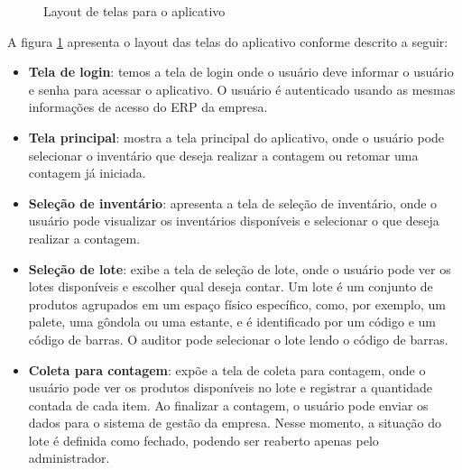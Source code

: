 \begin{figure}[t]
{    }
    \quad
    \caption{Layout de telas para o aplicativo}
    \label{fig:telas}
\end{figure}

A figura \ref{fig:telas} apresenta o layout das telas do aplicativo conforme descrito a seguir:

\begin{itemize}
    \item \textbf{Tela de login}: temos a tela de login onde o usuário deve informar o usuário e senha para acessar o aplicativo. O usuário é autenticado usando as mesmas informações de acesso do ERP da empresa.
    \item \textbf{Tela principal}: mostra a tela principal do aplicativo, onde o usuário pode selecionar o inventário que deseja realizar a contagem ou retomar uma contagem já iniciada. 
    \item \textbf{Seleção de inventário}: apresenta a tela de seleção de inventário, onde o usuário pode visualizar os inventários disponíveis e selecionar o que deseja realizar a contagem. 
    \item \textbf{Seleção de lote}: exibe a tela de seleção de lote, onde o usuário pode ver os lotes disponíveis e escolher qual deseja contar. Um lote é um conjunto de produtos agrupados em um espaço físico específico, como, por exemplo, um palete, uma gôndola ou uma estante, e é identificado por um código e um código de barras. O auditor pode selecionar o lote lendo o código de barras.
    \item \textbf{Coleta para contagem}: expõe a tela de coleta para contagem, onde o usuário pode ver os produtos disponíveis no lote e registrar a quantidade contada de cada item. Ao finalizar a contagem, o usuário pode enviar os dados para o sistema de gestão da empresa. Nesse momento, a situação do lote é definida como fechado, podendo ser reaberto apenas pelo administrador.
\end{itemize}

